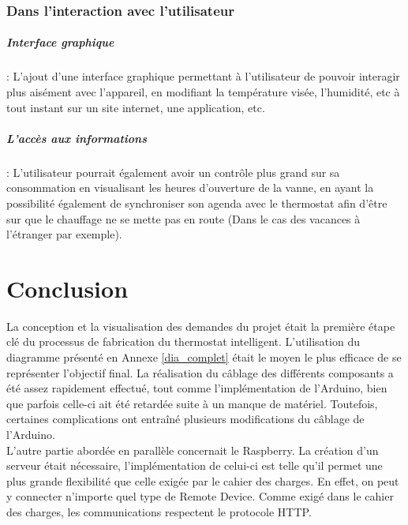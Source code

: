 \documentclass[11pt,a4paper,11pt]{report}
\begin{document}
\subsection*{Dans l'interaction avec l'utilisateur}

\paragraph{Interface graphique}: L'ajout d'une interface graphique permettant à l'utilisateur de pouvoir interagir plus aisément avec l'appareil, en modifiant la température visée, l'humidité, etc à tout instant sur un site internet, une application, etc.

\paragraph{L'accès aux informations}: L'utilisateur pourrait également avoir un contrôle plus grand sur sa consommation en visualisant les heures d'ouverture de la vanne, en ayant la possibilité également de synchroniser son agenda avec le thermostat afin d'être sur que le chauffage ne se mette pas en route (Dans le cas des vacances à l'étranger par exemple). 

\newpage

\chapter{Conclusion}

La conception et la visualisation des demandes du projet était la première étape clé du processus de fabrication du thermostat intelligent. L'utilisation du diagramme présenté en Annexe \ref{dia_complet} était le moyen le plus efficace de se représenter l'objectif final. La réalisation du câblage des différents composants a été assez rapidement effectué, tout comme l'implémentation de l'Arduino, bien que parfois celle-ci ait été retardée suite à un manque de matériel. Toutefois, certaines complications ont entraîné plusieurs modifications du câblage de l'Arduino.\\

L'autre partie abordée en parallèle concernait le Raspberry. La création d'un serveur était nécessaire, l'implémentation de celui-ci est telle qu'il permet une plus grande flexibilité que celle exigée par le cahier des charges. En effet, on peut y connecter n'importe quel type de Remote Device. Comme exigé dans le cahier des charges, les communications respectent le protocole HTTP.\\
\end{document}

